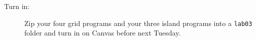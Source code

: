 \documentclass[12pt]{article}
\begin{document}
\begin{description}
\begin{itemize}
\end{itemize}

\item[Turn in:] Zip your four  grid programs and your
three island programs into a {\tt lab03 } folder and turn in on Canvas
before next Tuesday.

\end{description}
\end{document}
